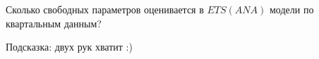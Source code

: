 
\begin{question}
Сколько свободных параметров оценивается в \(ETS(ANA)\) модели по квартальным данным?
\end{question}

\begin{solution}
Подсказка: двух рук хватит :)
\end{solution}

